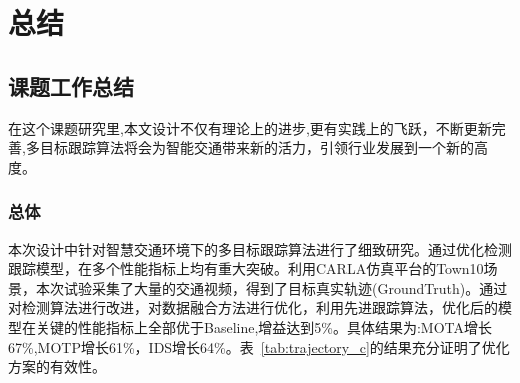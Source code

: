 \chapter{总结}


\section{课题工作总结}

在这个课题研究里,本文设计不仅有理论上的进步,更有实践上的飞跃，不断更新完善,多目标跟踪算法将会为智能交通带来新的活力，引领行业发展到一个新的高度。

\subsection{总体}


本次设计中针对智慧交通环境下的多目标跟踪算法进行了细致研究。通过优化检测跟踪模型，在多个性能指标上均有重大突破。利用CARLA仿真平台的Town10场景，本次试验采集了大量的交通视频，得到了目标真实轨迹(GroundTruth)。通过对检测算法进行改进，对数据融合方法进行优化，利用先进跟踪算法，优化后的模型在关键的性能指标上全部优于Baseline,增益达到5\%。具体结果为:MOTA增长67\%,MOTP增长61\%，IDS增长64\%。表~\ref{tab:trajectory_c}的结果充分证明了优化方案的有效性。


